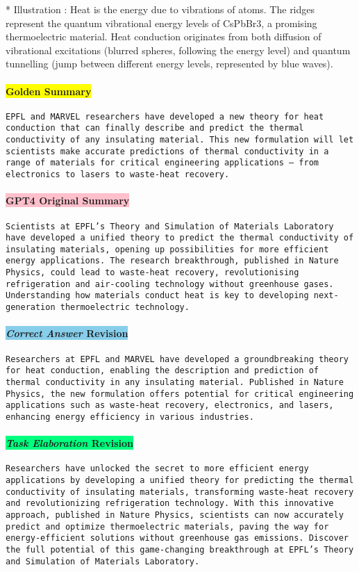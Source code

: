 {* Illustration : Heat is the energy due to vibrations of atoms. The ridges represent the quantum vibrational energy levels of CsPbBr3, a promising thermoelectric material. Heat conduction originates from both diffusion of vibrational excitations (blurred spheres, following the energy level) and quantum tunnelling (jump between different energy levels, represented by blue waves).}

\paragraph{\colorbox{yellow}{Golden Summary}}
\texttt{EPFL and MARVEL researchers have developed a new theory for heat conduction that can finally describe and predict the thermal conductivity of any insulating material. This new formulation will let scientists make accurate predictions of thermal conductivity in a range of materials for critical engineering applications – from electronics to lasers to waste-heat recovery.}

\paragraph{\colorbox{pink}{GPT4 Original Summary}}
\texttt{Scientists at EPFL's Theory and Simulation of Materials Laboratory have developed a unified theory to predict the thermal conductivity of insulating materials, opening up possibilities for more efficient energy applications. The research breakthrough, published in Nature Physics, could lead to waste-heat recovery, revolutionising refrigeration and air-cooling technology without greenhouse gases. Understanding how materials conduct heat is key to developing next-generation thermoelectric technology.}

\paragraph{\colorbox{SkyBlue}{\textit{Correct Answer} Revision}}
\texttt{Researchers at EPFL and MARVEL have developed a groundbreaking theory for heat conduction, enabling the description and prediction of thermal conductivity in any insulating material. Published in Nature Physics, the new formulation offers potential for critical engineering applications such as waste-heat recovery, electronics, and lasers, enhancing energy efficiency in various industries.}

\paragraph{\colorbox{SpringGreen}{\textit{Task Elaboration} Revision}}
\texttt{Researchers have unlocked the secret to more efficient energy applications by developing a unified theory for predicting the thermal conductivity of insulating materials, transforming waste-heat recovery and revolutionizing refrigeration technology. With this innovative approach, published in Nature Physics, scientists can now accurately predict and optimize thermoelectric materials, paving the way for energy-efficient solutions without greenhouse gas emissions. Discover the full potential of this game-changing breakthrough at EPFL's Theory and Simulation of Materials Laboratory.}





